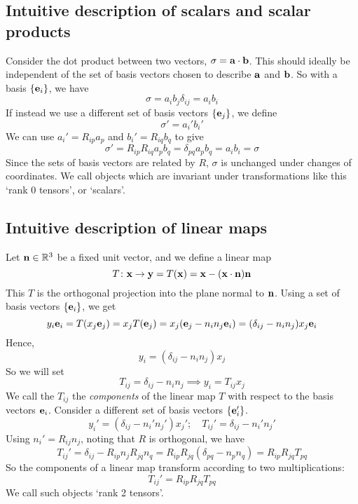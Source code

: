 \subsection{Intuitive description of scalars and scalar products}
Consider the dot product between two vectors, \(\sigma = \vb a \cdot \vb b\).
This should ideally be independent of the set of basis vectors chosen to describe \(\vb a\) and \(\vb b\).
So with a basis \(\{ \vb e_i \}\), we have
\[
	\sigma = a_i b_j \delta_{ij} = a_i b_i
\]
If instead we use a different set of basis vectors \(\{ \vb e_j \}\), we define
\[
	\sigma' = a_i' b_i'
\]
We can use \(a_i' = R_{ip} a_p\) and \(b_i' = R_{iq} b_q\) to give
\[
	\sigma' = R_{ip} R_{iq} a_p b_q = \delta_{pq} a_p b_q = a_i b_i = \sigma
\]
Since the sets of basis vectors are related by \(R\), \(\sigma\) is unchanged under changes of coordinates.
We call objects which are invariant under transformations like this `rank 0 tensors', or `scalars'.

\subsection{Intuitive description of linear maps}
Let \(\vb n \in \mathbb R^3\) be a fixed unit vector, and we define a linear map
\[
	T \colon \vb x \to \vb y = T(\vb x) = \vb x - (\vb x \cdot \vb n) \vb n
\]
This \(T\) is the orthogonal projection into the plane normal to \(\vb n\).
Using a set of basis vectors \(\{ \vb e_i \}\), we get
\[
	y_i \vb e_i = T(x_j \vb e_j) = x_j T(\vb e_j) = x_j (\vb e_j - n_i n_j \vb e_i) = (\delta_{ij} - n_i n_j) x_j \vb e_i
\]
Hence,
\[
	y_i = (\delta_{ij} - n_i n_j) x_j
\]
So we will set
\[
	T_{ij} = \delta_{ij} - n_i n_j \implies y_i = T_{ij} x_j
\]
We call the \(T_{ij}\) the \textit{components} of the linear map \(T\) with respect to the basis vectors \(\vb e_i\).
Consider a different set of basis vectors \(\{ \vb e_i' \}\).
\[
	y_i' = (\delta_{ij} - n_i' n_j') x_j';\quad T_{ij}' = \delta_{ij} - n_i' n_j'
\]
Using \(n_i' = R_{ij} n_j\), noting that \(R\) is orthogonal, we have
\[
	T_{ij}' = \delta_{ij} - R_{ip} n_j R_{jq} n_q = R_{ip} R_{jq} (\delta_{pq} - n_p n_q) = R_{ip} R_{jq} T_{pq}
\]
So the components of a linear map transform according to two multiplications:
\[
	T_{ij}' = R_{ip} R_{jq} T_{pq}
\]
We call such objects `rank 2 tensors'.

